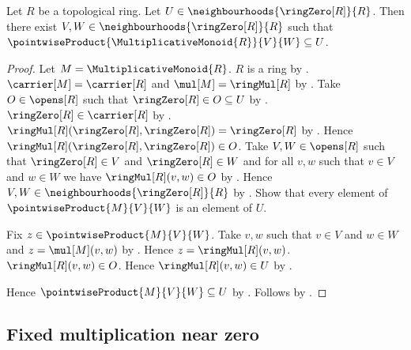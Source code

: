 \begin{lemma}\label{topological_ring_zero_neighbourhood_product}
    Let $R$ be a topological ring.
    Let $U\in\neighbourhoods{\ringZero[R]}{R}$.
    Then there exist $V,W\in\neighbourhoods{\ringZero[R]}{R}$ such that
        $\pointwiseProduct{\MultiplicativeMonoid{R}}{V}{W}\subseteq U$.
\end{lemma}
\begin{proof}
    Let $M=\MultiplicativeMonoid{R}$.
    $R$ is a ring by .
    $\carrier[M]=\carrier[R]$ and $\mul[M]=\ringMul[R]$ by
        .
    Take $O\in\opens[R]$ such that $\ringZero[R]\in O\subseteq U$ by
        .
    $\ringZero[R]\in\carrier[R]$ by .
    $\ringMul[R](\ringZero[R],\ringZero[R])=\ringZero[R]$ by
        .
    Hence $\ringMul[R](\ringZero[R],\ringZero[R])\in O$.
    Take $V,W\in\opens[R]$ such that
        $\ringZero[R]\in V$ and $\ringZero[R]\in W$ and
        for all $v,w$ such that $v\in V$ and $w\in W$ we have
            $\ringMul[R](v,w)\in O$ by
        .
    Hence $V,W\in\neighbourhoods{\ringZero[R]}{R}$ by
        .
    Show that every element of $\pointwiseProduct{M}{V}{W}$ is an element
        of $U$.
    \begin{subproof}
        Fix $z\in\pointwiseProduct{M}{V}{W}$.
        Take $v,w$ such that $v\in V$ and $w\in W$ and
            $z=\mul[M](v,w)$ by .
        Hence $z=\ringMul[R](v,w)$.
        $\ringMul[R](v,w)\in O$.
        Hence $\ringMul[R](v,w)\in U$ by .
    \end{subproof}
    Hence $\pointwiseProduct{M}{V}{W}\subseteq U$ by .
    Follows by \auto.
\end{proof}

\subsection{Fixed multiplication near zero}

